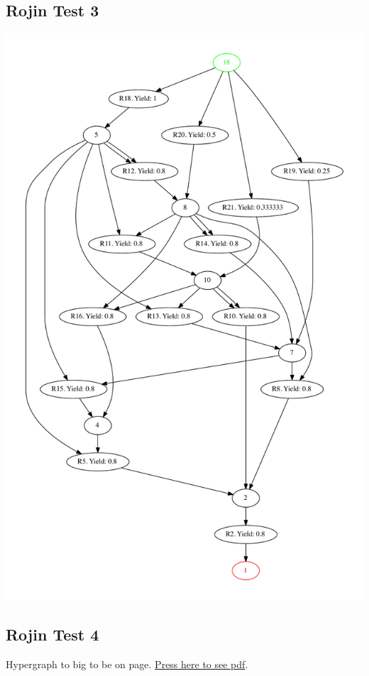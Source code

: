 \documentclass[a4paper,10pt,titlepage]{paper}
\begin{document}
\subsection{Rojin Test 3}
\includegraphics[scale=0.4]{RojinGrafer/Test3.pdf}
\label{Appendix::Rojin3}

\subsection{Rojin Test 4}
\begin{flushleft}
Hypergraph to big to be on page. \href{RojinGrafer/test4.pdf}{Press here to see pdf}.
\label{Appendix::Rojin4}
\end{flushleft}
\end{document}
